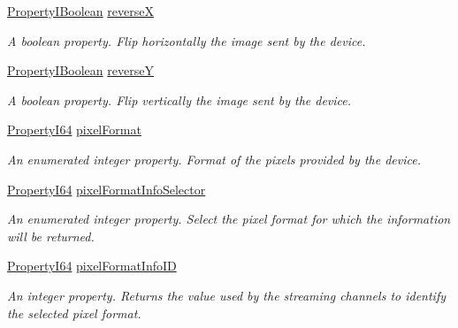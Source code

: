 \begin{DoxyCompactItemize}
\hyperlink{group___common_interface_ga44f9437e24b21b6c93da9039ec6786aa}{Property\+I\+Boolean} \hyperlink{classmv_i_m_p_a_c_t_1_1acquire_1_1_gen_i_cam_1_1_image_format_control_a53ced6d3112b74803251afaad3bfe073}{reverse\+X}
\begin{DoxyCompactList}\small\item\em A boolean property. Flip horizontally the image sent by the device. \end{DoxyCompactList}\item 
\hyperlink{group___common_interface_ga44f9437e24b21b6c93da9039ec6786aa}{Property\+I\+Boolean} \hyperlink{classmv_i_m_p_a_c_t_1_1acquire_1_1_gen_i_cam_1_1_image_format_control_a5909e5548bb71e53b5d7d32d1e06c894}{reverse\+Y}
\begin{DoxyCompactList}\small\item\em A boolean property. Flip vertically the image sent by the device. \end{DoxyCompactList}\item 
\hyperlink{group___common_interface_ga81749b2696755513663492664a18a893}{Property\+I64} \hyperlink{classmv_i_m_p_a_c_t_1_1acquire_1_1_gen_i_cam_1_1_image_format_control_a7f91f3c763df04e2957c3435a76705aa}{pixel\+Format}
\begin{DoxyCompactList}\small\item\em An enumerated integer property. Format of the pixels provided by the device. \end{DoxyCompactList}\item 
\hyperlink{group___common_interface_ga81749b2696755513663492664a18a893}{Property\+I64} \hyperlink{classmv_i_m_p_a_c_t_1_1acquire_1_1_gen_i_cam_1_1_image_format_control_afece092c2b57040873197c80520a2d65}{pixel\+Format\+Info\+Selector}
\begin{DoxyCompactList}\small\item\em An enumerated integer property. Select the pixel format for which the information will be returned. \end{DoxyCompactList}\item 
\hyperlink{group___common_interface_ga81749b2696755513663492664a18a893}{Property\+I64} \hyperlink{classmv_i_m_p_a_c_t_1_1acquire_1_1_gen_i_cam_1_1_image_format_control_a883b137388bec227535b01c76661c634}{pixel\+Format\+Info\+I\+D}
\begin{DoxyCompactList}\small\item\em An integer property. Returns the value used by the streaming channels to identify the selected pixel format. \end{DoxyCompactList}\item 

\end{DoxyCompactItemize}
